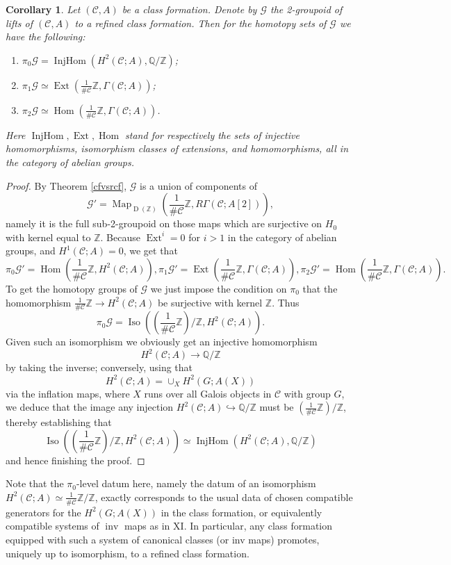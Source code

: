 \documentclass[12pt]{article}
\newtheorem{corollary}[theorem]{Corollary}
\theoremstyle{definition}
\newcommand{\on}{\operatorname}
\newcommand{\mc}{\mathcal}
\newcommand{\mbb}{\mathbb}
\begin{document}
\begin{corollary}\label{howtopromote}
Let $(\mc{C},A)$ be a class formation.  Denote by $\mc{G}$ the 2-groupoid of lifts of $(\mc{C},A)$ to a refined class formation.  Then for the homotopy sets of $\mc{G}$ we have the following:
\begin{enumerate}
\item $\pi_0\mc{G}=\on{InjHom}(H^2(\mc{C};A),\mbb{Q}/\mbb{Z})$;
\item $\pi_1\mc{G}\simeq \on{Ext}(\frac{1}{\#\mc{C}}\mbb{Z},\Gamma(\mc{C};A))$;
\item $\pi_2\mc{G}\simeq \on{Hom}(\frac{1}{\#\mc{C}}\mbb{Z},\Gamma(\mc{C};A))$.
\end{enumerate}
Here $\on{InjHom},\on{Ext},\on{Hom}$ stand for respectively the sets of injective homomorphisms, isomorphism classes of extensions, and homomorphisms, all in the category of abelian groups.
\end{corollary}
\begin{proof}
By Theorem \ref{cfvsrcf}, $\mc{G}$ is a union of components of $$\mc{G}' = \on{Map}_{\on{D}(\mbb{Z})}(\frac{1}{\#\mc{C}}\mbb{Z},R\Gamma(\mc{C};A[2])),$$
namely it is the full sub-2-groupoid on those maps which are surjective on $H_0$ with kernel equal to $\mbb{Z}$. Because $\on{Ext}^i=0$ for $i>1$ in the category of abelian groups, and $H^1(\mc{C};A)=0$, we get that
$$\pi_0\mc{G}' = \on{Hom}(\frac{1}{\#\mc{C}}\mbb{Z},H^2(\mc{C};A)), \pi_1\mc{G}' = \on{Ext}(\frac{1}{\#\mc{C}}\mbb{Z},\Gamma(\mc{C};A)), \pi_2\mc{G}'=\on{Hom}(\frac{1}{\#\mc{C}}\mbb{Z},\Gamma(\mc{C};A)).$$
To get the homotopy groups of $\mc{G}$ we just impose the condition on $\pi_0$ that the homomorphism $\frac{1}{\#\mc{C}}\mbb{Z}\to H^2(\mc{C};A)$ be surjective with kernel $\mbb{Z}$.  Thus
$$\pi_0\mc{G} = \on{Iso}(\left(\frac{1}{\#\mc{C}}\mbb{Z}\right)/\mbb{Z},H^2(\mc{C};A)).$$
Given such an isomorphism we obviously get an injective homomorphism
$$H^2(\mc{C};A)\to\mbb{Q}/\mbb{Z}$$
by taking the inverse; conversely, using that
$$H^2(\mc{C};A) = \cup_X H^2(G;A(X))$$
via the inflation maps, where $X$ runs over all Galois objects in $\mc{C}$ with group $G$, we deduce that the image any injection $H^2(\mc{C};A)\hookrightarrow\mbb{Q}/\mbb{Z}$ must be $\left(\frac{1}{\#\mc{C}}\mbb{Z}\right)/\mbb{Z}$, thereby establishing that 
$$\on{Iso}(\left(\frac{1}{\#\mc{C}}\mbb{Z}\right)/\mbb{Z},H^2(\mc{C};A))\simeq \on{InjHom}(H^2(\mc{C};A),\mbb{Q}/\mbb{Z})$$
and hence finishing the proof.
\end{proof}

Note that the $\pi_0$-level datum here, namely the datum of an isomorphism $H^2(\mc{C};A)\simeq\frac{1}{\#\mc{C}}\mbb{Z}/\mbb{Z}$, exactly corresponds to the usual data of chosen compatible generators for the $H^2(G;A(X))$ in the class formation, or equivalently compatible systems of $\on{inv}$ maps as in \cite{corpslocaux} XI.  In particular, any class formation equipped with such a system of canonical classes (or inv maps) promotes, uniquely up to isomorphism, to a refined class formation.
\end{document}
